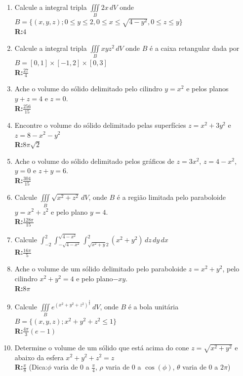 \documentclass[oneside,a4paper,12pt]{article}
\newcommand{\R}{\\{\bf R:}}
\newcommand{\iiintB}{\displaystyle \iiint \limits_B}
\begin{document}
\begin{enumerate}
	\item Calcule a integral tripla $\iiintB 2x\,dV$ onde $B=\{(x,y,z);0\leq y \leq 2, 0 \leq x \leq \sqrt{4-y^2},0\leq z \leq y\}$ \R $4$
	
	\item Calcule a integral tripla $\iiintB xyz^2\,dV$ onde $B$ é a caixa retangular dada por $B=\left[0,1\right]\times\left[-1,2\right]\times\left[0,3\right]$ \R$\displaystyle \frac{27}{4}$
	
	\item Ache o volume do sólido delimitado pelo cilindro $y=x^2$ e pelos planos $y+z=4$ e $z=0$. \R$\displaystyle \frac{256}{15}$
	
	\item Encontre o volume do sólido delimitado pelas superfícies $z=x^2+3y^2$ e $z=8-x^2-y^2$ \R $8\pi\sqrt{2}$
	
	\item Ache o volume do sólido delimitado pelos gráficos de $z=3x^2$, $z=4-x^2$, $y=0$ e $z+y=6$. \R$\displaystyle \frac{304}{15}$
	
	\item Calcule $\iiintB\sqrt{x^2+z^2}\,dV$, onde $B$ é a região limitada pelo paraboloide $y=x^2+z^2$ e pelo plano $y=4$.\R$\displaystyle \frac{128\pi}{15}$
	
	\item Calcule $\displaystyle \int_{-2}^{2}\!\int_{-\sqrt{4-x^2}}^{\sqrt{4-x^2}}\!\int_{\sqrt{x^2+y} 2}^{2}(x^2+y^2)\,dz\,dy\,dx$ \R$\displaystyle \frac{16\pi}{5}$
	
	\item Ache o volume de um sólido delimitado pelo paraboloide $z=x^2+y^2$, pelo cilindro $x^2+y^2=4$ e pelo plano$-xy$.\R$8\pi$
	
	\item Calcule $\iiintB e^{(x^2+y^2+z^2)^\frac{3}{2}}\,dV$, onde $B$ é a bola unitária $B=\{(x,y,z);x^2+y^2+z^2\leq 1\}$ \R$\displaystyle \frac{4\pi}{3}(e -1)$
	
	\item Determine o volume de um sólido que está acima do cone $z = \sqrt{x^2+y^2}$ e abaixo da esfera $x^2+y^2+z^2=z$\R$\displaystyle\frac{\pi}{8}$ 
	(Dica:$\phi$ varia de $0$ a $\frac{\pi}{4}$, $\rho$ varia de $0$ a $\cos(\phi)$, $\theta$ varia de $0$ a $2\pi$)
	
	
\end{enumerate}


	
\end{document}
